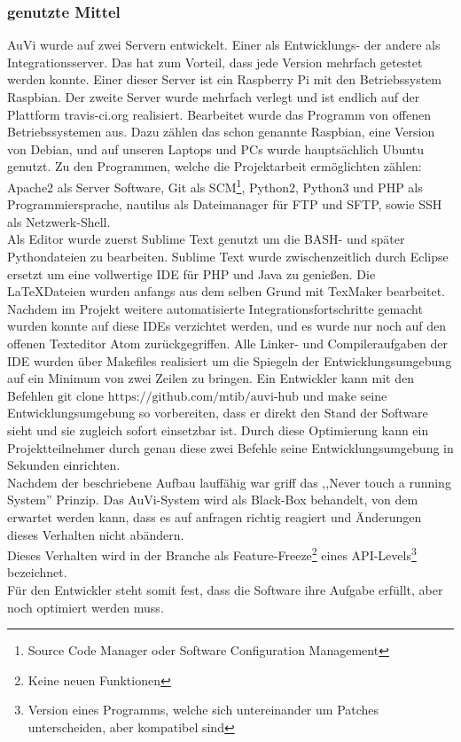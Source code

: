 \subsubsection{genutzte Mittel} %
AuVi wurde auf zwei Servern entwickelt.
Einer als Entwicklungs- der andere als Integrationsserver.
Das hat zum Vorteil, dass jede Version mehrfach getestet werden konnte.
Einer dieser Server ist ein Raspberry Pi mit den Betriebssystem Raspbian.
Der zweite Server wurde mehrfach verlegt und
ist endlich auf der Plattform travis-ci.org realisiert.
Bearbeitet wurde das Programm von offenen Betriebssystemen aus.
Dazu zählen das schon genannte
Raspbian, eine Version von Debian,
und auf unseren Laptops und PCs wurde hauptsächlich Ubuntu genutzt.
Zu den Programmen, welche die Projektarbeit ermöglichten zählen: Apache2 als Server
Software, Git als SCM\footnote{Source Code Manager oder Software Configuration Management},
Python2, Python3 und PHP als Programmiersprache,
nautilus als Dateimanager für FTP und SFTP, sowie
SSH als Netzwerk-Shell.\\
Als Editor wurde zuerst Sublime Text genutzt
um die BASH- und später Pythondateien zu bearbeiten.
Sublime Text wurde zwischenzeitlich durch Eclipse
ersetzt um eine vollwertige IDE für PHP und Java zu
genießen. Die \LaTeX Dateien wurden anfangs aus dem selben Grund mit TexMaker bearbeitet.
Nachdem im Projekt weitere automatisierte Integrationsfortschritte gemacht wurden konnte auf
diese IDEs verzichtet werden,
und es wurde nur noch auf den offenen Texteditor Atom zurückgegriffen.
Alle Linker- und Compileraufgaben der IDE wurden über Makefiles realisiert um die Spiegeln der
Entwicklungsumgebung auf ein Minimum von zwei Zeilen zu bringen. Ein Entwickler kann mit den
Befehlen $\text{git clone https://github.com/mtib/auvi-hub}$ und $\text{make}$ seine Entwicklungsumgebung
so vorbereiten, dass er direkt den Stand der Software sieht und sie zugleich sofort einsetzbar ist.
Durch diese Optimierung kann ein Projektteilnehmer durch genau diese zwei Befehle seine Entwicklungsumgebung
in Sekunden einrichten.\\
Nachdem der beschriebene Aufbau lauffähig war griff das ,,Never touch a running System'' Prinzip.
Das AuVi-System wird als Black-Box behandelt, von dem erwartet werden kann, dass es auf anfragen
richtig reagiert und Änderungen dieses Verhalten nicht abändern.\\
Dieses Verhalten wird in der Branche als Feature-Freeze\footnote{Keine neuen Funktionen}
eines API-Levels\footnote{Version eines Programms, welche sich untereinander um Patches unterscheiden,
aber kompatibel sind} \cite{semver} bezeichnet.\\
Für den Entwickler steht somit fest, dass die Software ihre Aufgabe erfüllt, aber noch optimiert
werden muss.

